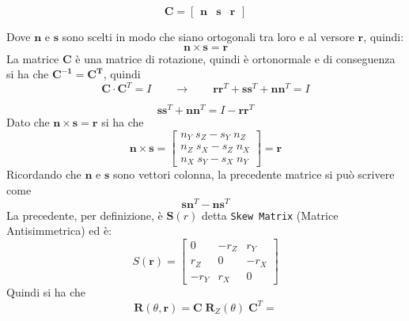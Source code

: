 ﻿\documentclass[11pt, a4paper]{article}
\begin{document}
\[
    \mathbf{C} =
    \begin{bmatrix}
        \mathbf{n} & \mathbf{s} & \mathbf{r}
    \end{bmatrix}
\]

Dove \(\mathbf{n}\) e \(\mathbf{s}\) sono scelti in modo che siano ortogonali tra loro e al versore \(\mathbf{r}\), quindi:
\[
    \mathbf{n} \times \mathbf{s} = \mathbf{r}
\]
La matrice \(\mathbf{C}\) è una matrice di rotazione, quindi è ortonormale e di conseguenza si ha che \(\mathbf{C^{-1}} = \mathbf{C^{T}}\), quindi
\[
    \mathbf{C} \cdot \mathbf{C}^{T} = I \qquad\longrightarrow\qquad
    \mathbf{r}\mathbf{r}^{T} + \mathbf{s}\mathbf{s}^{T} + \mathbf{n}\mathbf{n}^{T} = I
\]

\[
    \mathbf{s}\mathbf{s}^{T} + \mathbf{n}\mathbf{n}^{T} = I - \mathbf{r}\mathbf{r}^{T}
\]
Dato che \(\mathbf{n} \times \mathbf{s} = \mathbf{r}\) si ha che
\[
\mathbf{n} \times \mathbf{s} =
\begin{bmatrix}
    n_{Y} \; s_{Z} - s_{Y} \; n_{Z}\\
    n_{Z} \; s_{X} - s_{Z} \; n_{X}\\
    n_{X} \; s_{Y} - s_{X} \; n_{Y}
\end{bmatrix}
= \mathbf{r}
\]
Ricordando che $\mathbf{n}$ e $\mathbf{s}$ sono vettori colonna, la precedente matrice si può scrivere come
\[
    \mathbf{s}\mathbf{n}^{T} - \mathbf{n}\mathbf{s}^{T}
\]
La precedente, per definizione, è $\mathbf{S}(r)$ detta \texttt{Skew Matrix} (Matrice Antisimmetrica) ed è:
\[
    S(\mathbf{r}) =
    \begin{bmatrix}
        0 & -r_{Z} & r_{Y}\\
        r_{Z} & 0 & -r_{X}\\
        -r_{Y} & r_{X} & 0
    \end{bmatrix}
\]
Quindi si ha che
\[
    \mathbf{R}(\theta, \mathbf{r}) = \mathbf{C} \; \mathbf{R}_Z(\theta) \; \mathbf{C}^{T} =
\]
\end{document}
